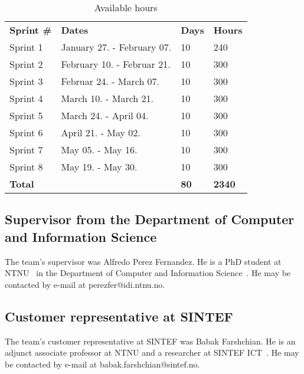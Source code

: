\begin{table}[H]
\centering
{}
\begin{tabular}{|l|l|l|l|}
\hline
\textbf{Sprint \#} & \textbf{Dates} & \textbf{Days} & \textbf{Hours}\\
Sprint 1& January 27. - February 07. & 10  & 240 \\
Sprint 2 & February 10. - Februar 21. &10  & 300 \\
Sprint 3 & Februar 24. - March 07. &10 & 300 \\
Sprint 4 & March 10. - March 21. &10  &300 \\
Sprint 5 & March 24. - April 04. &10&  300 \\
Sprint 6 & April 21. - May 02. &10  &300 \\
Sprint 7 & May 05. - May 16. &10  &300 \\
Sprint 8 & May 19. - May 30. &10  &300 \\
\textbf{Total}&& \textbf{80}&  \textbf{2340}\\\hline
\end{tabular}
\caption{Available hours}
\label{tab:availHours}
\end{table}



\subsection{Supervisor from the Department of Computer and Information Science}
The team's supervisor was Alfredo Perez Fernandez. He is a PhD student at NTNU~\cite{ntnu} in the Department of Computer and Information Science~\cite{idi}. He may be contacted by e-mail at perezfer@idi.ntnu.no.

\subsection{Customer representative at SINTEF}
The team's customer representative at SINTEF was Babak Farshchian. He is an adjunct associate professor at NTNU and a researcher at SINTEF ICT~\cite{sintefict}. He may be contacted by e-mail at babak.farshchian@sintef.no.
